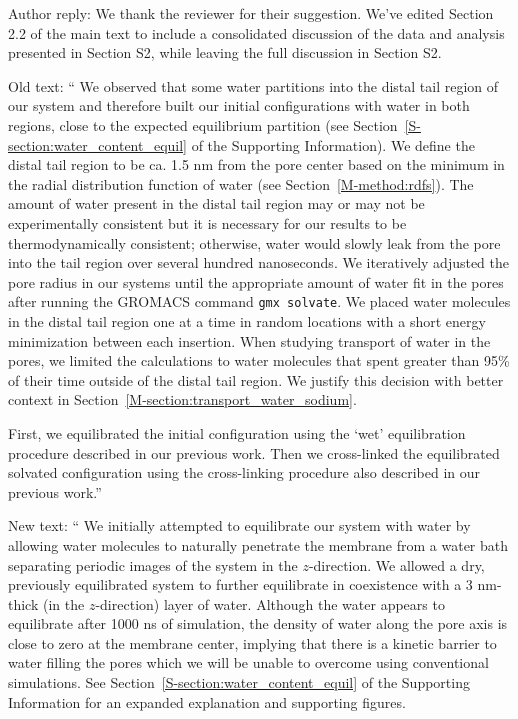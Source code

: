 \documentclass{article}
\begin{document}
\begin{enumerate}
\begin{quote}
    \end{quote}
    
    Author reply: We thank the reviewer for their suggestion. We've edited Section 2.2 of the main
    text to include a consolidated discussion of the data and analysis presented in Section S2, 
    while leaving the full discussion in Section S2.
    
    Old text: `` We observed that some water partitions into the distal tail region of our system and therefore
	built our initial configurations with water in both regions, close to the expected
	equilibrium partition (see Section~\ref{S-section:water_content_equil} of the Supporting
	Information). We define the distal tail region to be ca. 1.5 nm from the pore
	center based on the minimum in the radial distribution function of water
	(see Section~\ref{M-method:rdfs}). The amount of water present in the distal tail region
	may or may not be experimentally consistent but it is necessary for our results to be 
	thermodynamically consistent; otherwise, water would slowly leak from the pore into the
	tail region over several hundred nanoseconds. We iteratively adjusted the pore radius in our systems
	until the appropriate amount of water fit in the pores after running the GROMACS command
	\texttt{gmx solvate}. We placed water molecules in the distal tail region one at a time
	in random locations with a short energy minimization between each insertion. When 
	studying transport of water in the pores, we limited the calculations to water molecules
	that spent greater than 95\% of their time outside of the distal tail region. We 
	justify this decision with better context in Section~\ref{M-section:transport_water_sodium}.
	
    First, we equilibrated the initial configuration using the `wet' equilibration procedure 
	described in our previous work. Then we cross-linked the equilibrated solvated 
	configuration using the cross-linking procedure also described in our previous 
    work.''
           
    New text: `` We initially attempted to equilibrate our system with water by allowing water
	molecules to naturally penetrate the membrane from a water bath separating
	periodic images of the system in the $z$-direction. We allowed a dry, previously
	equilibrated system to further equilibrate in coexistence with a 3 nm-thick 
	(in the $z$-direction) layer of water. Although the water appears to equilibrate
	after 1000 ns of simulation, the density of water along the pore axis
	is close to zero at the membrane center, implying that there is a kinetic
	barrier to water filling the pores which we will be unable to overcome using
	conventional simulations. See Section~\ref{S-section:water_content_equil} of the
	Supporting Information for an expanded explanation and supporting figures. 
	  

\end{enumerate}
\end{document}

